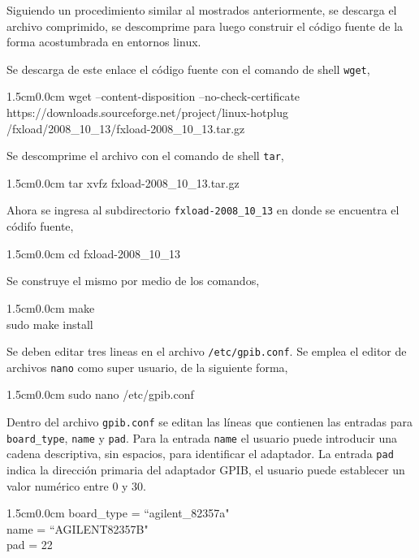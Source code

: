 \documentclass[paper=letter,oneside,fontsize=11pt, parskip=full]{scrartcl}
\newenvironment{code}
	{\begin{adjustwidth}{1.5cm}{0.0cm}\ttfamily}
	{\end{adjustwidth}}
\begin{document}
 		Siguiendo un procedimiento similar al mostrados anteriormente, se descarga el archivo comprimido, se descomprime para luego construir el código fuente de la forma acostumbrada en entornos linux. 
		
		Se descarga de este enlace el código fuente con el comando de shell \texttt{wget},
		
		\begin{code}			
			wget --content-disposition --no-check-certificate \\ https://downloads.sourceforge.net/project/linux-hotplug \\ /fxload/2008\_10\_13/fxload-2008\_10\_13.tar.gz
		\end{code}
		
		Se descomprime el archivo con el comando de shell \texttt{tar},

		\begin{code}				
			tar xvfz fxload-2008\_10\_13.tar.gz
		\end{code}
	
		Ahora se ingresa al subdirectorio \texttt{fxload-2008\_10\_13} en donde se encuentra el códifo fuente,

		\begin{code}			
			cd fxload-2008\_10\_13
		\end{code}
		
		Se construye el mismo por medio de los comandos,
		
		\begin{code}	
			make	\\		
			sudo make install
		\end{code}
		
		Se deben editar tres lineas en el archivo \texttt{/etc/gpib.conf}. Se emplea el editor de archivos \texttt{nano} como super usuario, de la siguiente forma, 
		
		\begin{code}			
			sudo nano /etc/gpib.conf
		\end{code}
		
		Dentro del archivo \texttt{gpib.conf} se editan las líneas que contienen las entradas para \texttt{board\_type}, \texttt{name} y \texttt{pad}. Para la entrada \texttt{name} el usuario puede introducir una cadena descriptiva, sin espacios, para identificar el adaptador. La entrada \texttt{pad} indica la dirección primaria del adaptador GPIB, el usuario puede establecer un valor numérico entre 0 y 30.
		
		\begin{code}	
			board\_type = ``agilent\_82357a" \\		
			name = ``AGILENT82357B" \\		
			pad = 22
		\end{code}
		
\end{document}
